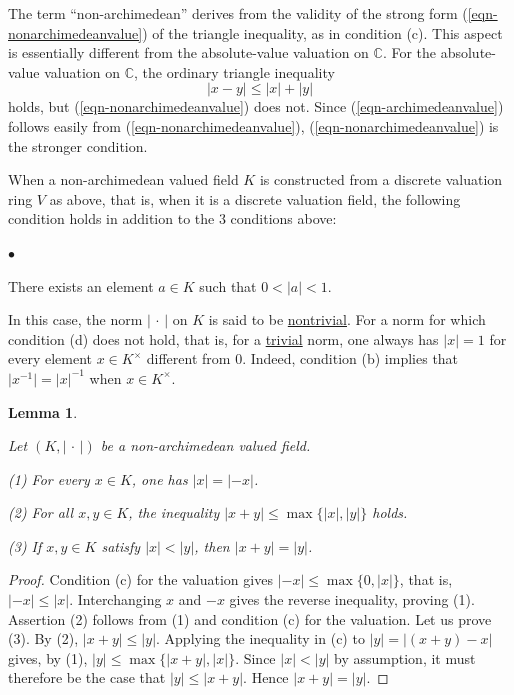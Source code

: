 \documentclass[a4paper,12pt, dvipdfmx]{jsbook}
\def\C{\mathbb{C}}
\newcommand{\abs}[1]{\lvert#1\rvert}
\renewenvironment{itemize}%
{%
   \begin{list}{\parbox{1zw}{$\bullet$}}%
   {%
      \setlength{\topsep}{.5zh}
      \setlength{\itemindent}{0zw}
      \setlength{\leftmargin}{3zw}%
      \setlength{\rightmargin}{0zw}%
      \setlength{\labelsep}{.5zw}%
      \setlength{\labelwidth}{3zw}%
      \setlength{\itemsep}{0.2em}%
      \setlength{\parsep}{0em}%
      \setlength{\listparindent}{0zw}%
   }
}{%
   \end{list}%
}
\theoremstyle{plain}
\newtheorem{lem}[thm]{\bfseries Lemma}
\theoremstyle{definition}
\begin{document}
The term ``non-archimedean'' derives from the validity of the strong form (\ref{eqn-nonarchimedeanvalue}) of the triangle inequality, as in condition (c).
This aspect is essentially different from the absolute-value valuation on $\C$.
For the absolute-value valuation on $\C$, the ordinary triangle inequality
\begin{equation}\label{eqn-archimedeanvalue}
\abs{x-y}\leq\abs{x}+\abs{y}
\end{equation}
holds, but (\ref{eqn-nonarchimedeanvalue}) does not.
Since (\ref{eqn-archimedeanvalue}) follows easily from (\ref{eqn-nonarchimedeanvalue}), (\ref{eqn-nonarchimedeanvalue}) is the stronger condition.

When a non-archimedean valued field $K$ is constructed from a discrete valuation ring $V$ as above, that is, when it is a discrete valuation field, the following condition holds in addition to the $3$ conditions above:
\begin{itemize}
\item[(d)] There exists an element $a\in K$ such that $0<\abs{a}<1$.
\end{itemize}
In this case, the norm $\abs{\,\cdot\,}$ on $K$ is said to be \underline{nontrivial}.
For a norm for which condition (d) does not hold, that is, for a \underline{trivial} norm, one always has $\abs{x}=1$ for every element $x\in K^{\times}$ different from $0$.
Indeed, condition (b) implies that $\abs{x^{-1}}=\abs{x}^{-1}$ when $x\in K^{\times}$.

\begin{lem}\label{lem-nonarchimedeanvaluedfields1}{\rm 
Let $(K,\abs{\,\cdot\,})$ be a non-archimedean valued field.

{\rm (1)} For every $x\in K$, one has $\abs{x}=\abs{-x}$.

{\rm (2)} For all $x,y\in K$, the inequality $\abs{x+y}\leq\max\{\abs{x},\abs{y}\}$ holds.

{\rm (3)} If $x,y\in K$ satisfy $\abs{x}<\abs{y}$, then $\abs{x+y}=\abs{y}$.}
\end{lem}

\begin{proof}[Proof]
Condition (c) for the valuation gives $\abs{-x}\leq\max\{0,\abs{x}\}$, that is, $\abs{-x}\leq\abs{x}$.
Interchanging $x$ and $-x$ gives the reverse inequality, proving (1).
Assertion (2) follows from (1) and condition (c) for the valuation.
Let us prove (3). By (2), $\abs{x+y}\leq\abs{y}$.
Applying the inequality in (c) to $\abs{y}=\abs{(x+y)-x}$ gives, by (1), $\abs{y}\leq\max\{\abs{x+y},\abs{x}\}$. Since $\abs{x}<\abs{y}$ by assumption, it must therefore be the case that $\abs{y}\leq\abs{x+y}$.
Hence $\abs{x+y}=\abs{y}$.
\end{proof}
\end{document}
